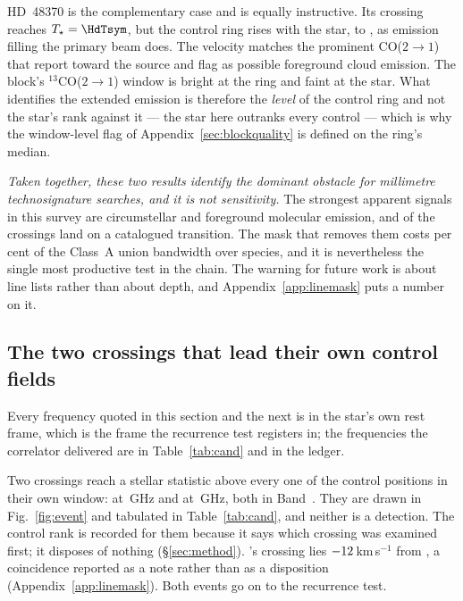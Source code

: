 HD~48370 is the complementary case and is equally instructive. Its crossing
reaches $T_\star=\HdTsym$, but the control ring rises with the star, to
\HdRingMax, as emission filling the primary beam does. The velocity matches
the prominent CO($2{\to}1$) that \citet{Cataldi2023} report toward the
source and flag as possible foreground cloud emission. The block's
$^{13}$CO($2{\to}1$) window is bright at the ring and faint at the star.
What identifies the extended emission is therefore the \emph{level} of the
control ring and not the star's rank against it --- the star here outranks
every control --- which is why the window-level flag of
Appendix~\ref{sec:blockquality} is defined on the ring's median.

\emph{Taken together, these two results identify the dominant obstacle for
millimetre technosignature searches, and it is not sensitivity.} The
strongest apparent signals in this survey are circumstellar and foreground
molecular emission, and \NAttributed{} of the \NCross{} crossings land on a
catalogued transition. The mask that removes them costs \MkMaskAPct{} per
cent of the Class~A union bandwidth over \FrNSpec{} species, and it is
nevertheless the single most productive test in the chain. The warning for
future work is about line lists rather than about depth, and
Appendix~\ref{app:linemask} puts a number on it.

\subsection{The two crossings that lead their own control fields}
\label{sec:vistest}

Every frequency quoted in this section and the next is in the star's own rest
frame, which is the frame the recurrence test registers in; the frequencies
the correlator delivered are in Table~\ref{tab:cand} and in the ledger.

Two crossings reach a stellar statistic above every one of the \NCtrl{}
control positions in their own window: \EvAStar{} at \RqFreqSx\,GHz and
\EvBStar{} at \RqFreqCp\,GHz, both in Band~\EvABand. They are drawn in
Fig.~\ref{fig:event} and tabulated in Table~\ref{tab:cand}, and neither is a
detection. The control rank is recorded for them because it says which
crossing was examined first; it disposes of nothing (\S\ref{sec:method}).
\EvBStar's crossing lies $-12$\,km\,s$^{-1}$ from \EvBLine, a coincidence
reported as a note rather than as a disposition
(Appendix~\ref{app:linemask}). Both events go on to the recurrence test.

